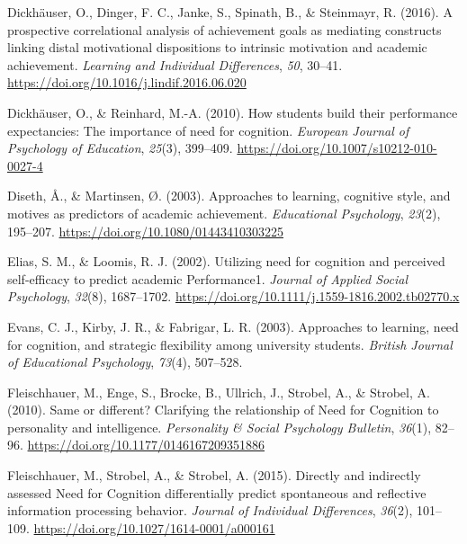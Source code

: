 \documentclass[
  man]{apa6}
\newlength{\cslhangindent}
\newlength{\cslentryspacingunit} %
\newenvironment{CSLReferences}[2] %
 {%
  \setlength{\parindent}{0pt}
  \ifodd #1
  \let\oldpar\par
  \def\par{\hangindent=\cslhangindent\oldpar}
  \fi
  \setlength{\parskip}{#2\cslentryspacingunit}
 }%
 {}
\begin{document}
\begin{CSLReferences}{1}{0}
\leavevmode{}%
Dickhäuser, O., Dinger, F. C., Janke, S., Spinath, B., \& Steinmayr, R. (2016). A prospective correlational analysis of achievement goals as mediating constructs linking distal motivational dispositions to intrinsic motivation and academic achievement. \emph{Learning and Individual Differences}, \emph{50}, 30--41. \url{https://doi.org/10.1016/j.lindif.2016.06.020}

\leavevmode{}%
Dickhäuser, O., \& Reinhard, M.-A. (2010). How students build their performance expectancies: The importance of need for cognition. \emph{European Journal of Psychology of Education}, \emph{25}(3), 399--409. \url{https://doi.org/10.1007/s10212-010-0027-4}

\leavevmode{}%
Diseth, Å., \& Martinsen, Ø. (2003). Approaches to learning, cognitive style, and motives as predictors of academic achievement. \emph{Educational Psychology}, \emph{23}(2), 195--207. \url{https://doi.org/10.1080/01443410303225}

\leavevmode{}%
Elias, S. M., \& Loomis, R. J. (2002). Utilizing need for cognition and perceived self-efficacy to predict academic Performance1. \emph{Journal of Applied Social Psychology}, \emph{32}(8), 1687--1702. \url{https://doi.org/10.1111/j.1559-1816.2002.tb02770.x}

\leavevmode{}%
Evans, C. J., Kirby, J. R., \& Fabrigar, L. R. (2003). Approaches to learning, need for cognition, and strategic flexibility among university students. \emph{British Journal of Educational Psychology}, \emph{73}(4), 507--528.

\leavevmode{}%
Fleischhauer, M., Enge, S., Brocke, B., Ullrich, J., Strobel, A., \& Strobel, A. (2010). Same or different? Clarifying the relationship of {N}eed for {C}ognition to personality and intelligence. \emph{Personality \& Social Psychology Bulletin}, \emph{36}(1), 82--96. \url{https://doi.org/10.1177/0146167209351886}

\leavevmode{}%
Fleischhauer, M., Strobel, A., \& Strobel, A. (2015). Directly and indirectly assessed {N}eed for {C}ognition differentially predict spontaneous and reflective information processing behavior. \emph{Journal of Individual Differences}, \emph{36}(2), 101--109. \url{https://doi.org/10.1027/1614-0001/a000161}


\end{CSLReferences}
\end{document}
